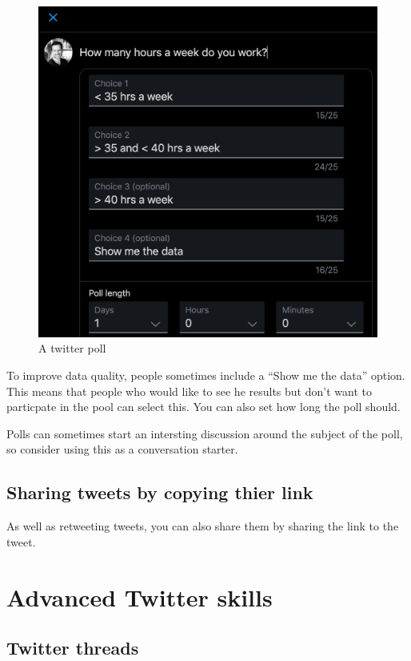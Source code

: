 \documentclass[]{book}
\begin{document}
\begin{figure}

{\centering \includegraphics[width=0.8\linewidth]{images/poll} 

}

\caption{A twitter poll}\label{fig:poll}
\end{figure}

To improve data quality, people sometimes include a ``Show me the data'' option. This means that people who would like to see he results but don't want to particpate in the pool can select this. You can also set how long the poll should.

Polls can sometimes start an intersting discussion around the subject of the poll, so consider using this as a conversation starter.

\hypertarget{sharing-tweets-by-copying-thier-link}{%
\section{Sharing tweets by copying thier link}\label{sharing-tweets-by-copying-thier-link}}

As well as retweeting tweets, you can also share them by sharing the link to the tweet.

\hypertarget{advanced-twitter-skills}{%
\chapter{Advanced Twitter skills}\label{advanced-twitter-skills}}

\hypertarget{twitter-threads}{%
\section{Twitter threads}\label{twitter-threads}}
\end{document}
